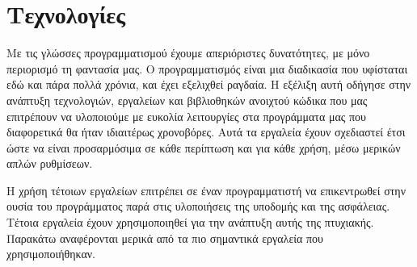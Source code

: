\chapter{Τεχνολογίες}

Με τις γλώσσες προγραμματισμού έχουμε απεριόριστες δυνατότητες, με μόνο περιορισμό τη φαντασία μας.
Ο προγραμματισμός είναι μια διαδικασία που υφίσταται 
εδώ και πάρα πολλά χρόνια, και έχει εξελιχθεί ραγδαία. Η εξέλιξη αυτή οδήγησε στην ανάπτυξη τεχνολογιών, εργαλείων και βιβλιοθηκών ανοιχτού κώδικα που μας επιτρέπουν να υλοποιούμε με ευκολία λειτουργίες στα προγράμματα μας που διαφορετικά θα ήταν ιδιαιτέρως χρονοβόρες.
Αυτά τα εργαλεία έχουν σχεδιαστεί έτσι ώστε να είναι προσαρμόσιμα σε κάθε περίπτωση και για κάθε χρήση, μέσω μερικών απλών ρυθμίσεων.

Η χρήση τέτοιων εργαλείων επιτρέπει σε έναν προγραμματιστή να επικεντρωθεί στην ουσία του προγράμματος παρά στις υλοποιήσεις της υποδομής και της ασφάλειας. Τέτοια εργαλεία έχουν χρησιμοποιηθεί για την ανάπτυξη αυτής της πτυχιακής. Παρακάτω αναφέρονται μερικά από τα πιο σημαντικά εργαλεία που χρησιμοποιήθηκαν.



